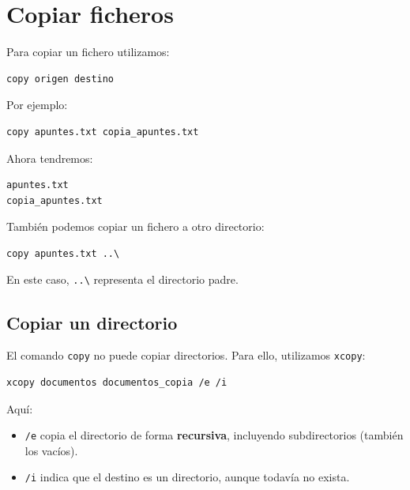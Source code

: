 \documentclass[11pt,a4paper]{article}
\begin{document}
\section{Copiar ficheros}

Para copiar un fichero utilizamos:

\begin{lstlisting}
copy origen destino
\end{lstlisting}

\noindent Por ejemplo:

\begin{lstlisting}
copy apuntes.txt copia_apuntes.txt
\end{lstlisting}

\noindent Ahora tendremos:

\begin{lstlisting}
apuntes.txt
copia_apuntes.txt
\end{lstlisting}

\noindent También podemos copiar un fichero a otro directorio:

\begin{lstlisting}
copy apuntes.txt ..\
\end{lstlisting}

\noindent En este caso, \texttt{..\textbackslash} representa el
directorio padre.

\subsection{Copiar un directorio}

El comando \texttt{copy} no puede copiar directorios. Para ello, utilizamos \texttt{xcopy}:

\begin{lstlisting}
xcopy documentos documentos_copia /e /i
\end{lstlisting}

\noindent Aquí:

\begin{itemize}
    \item \texttt{/e} copia el directorio de forma
          \textbf{recursiva}, incluyendo subdirectorios (también los
          vacíos).
    \item \texttt{/i} indica que el destino es un directorio, aunque
          todavía no exista.
\end{itemize}
\end{document}
